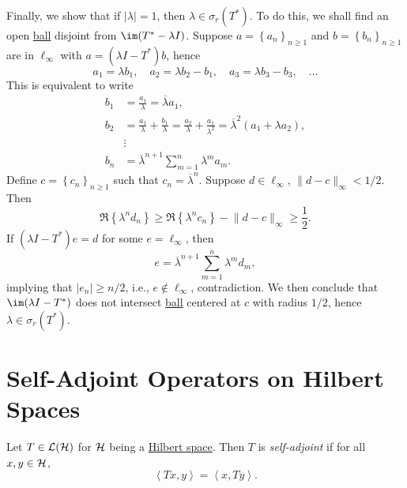 \begin{eg}
\begin{itemize}
		      Finally, we show that if \(\vert \lambda  \vert = 1\), then \(\lambda \in \sigma _r(T^{\ast} )\). To do this, we shall find an open \hyperref[def:ball]{ball} disjoint from \(\im(T^{\ast} - \lambda I)\). Suppose \(a = \left\{ a_n \right\} _{n\geq 1}\) and \(b = \left\{ b_n \right\} _{n\geq 1}\) are in \(\ell _\infty \) with \(a = (\lambda I-T^{\ast} )b\), hence
		      \[
			      a_1 = \lambda b_1,\quad
			      a_2 = \lambda b_2 - b_1,\quad
			      a_3 = \lambda b_3 - b_3, \quad \ldots
		      \]
		      This is equivalent to write
		      \[
			      \begin{split}
				      b_1 &= \frac{a_1}{\lambda } = \overline{\lambda} a_1, \\
				      b_2 &= \frac{a_1}{\lambda } + \frac{b_1}{\lambda } = \frac{a_2}{\lambda } + \frac{a_1}{\lambda ^{2} } = \overline{\lambda} ^{2} (a_1 + \lambda a_2), \\
				      &\vdots\\
				      b_n &= \overline{\lambda} ^{n+1}\sum_{m=1}^{n} \lambda ^m a_m.
			      \end{split}
		      \]
		      Define \(c = \left\{ c_n \right\} _{n\geq 1}\) such that \(c_n = \overline{\lambda} ^n\). Suppose \(d\in \ell _\infty \), \(\lVert d-c \rVert _\infty < 1/2\). Then
		      \[
			      \Re \left\{ \lambda ^n d_n \right\}
			      \geq \Re \left\{ \lambda ^n c_n \right\} - \lVert d-c \rVert _\infty
			      \geq \frac{1}{2}.
		      \]
		      If \((\lambda I - T^{\ast} ) e = d\) for some \(e = \ell _\infty \), then
		      \[
			      e = \overline{\lambda} ^{n+1} \sum_{m=1}^{n} \lambda ^m d_m,
		      \]
		      implying that \(\vert e_n \vert \geq n / 2\), i.e., \(e \notin \ell _\infty \), contradiction. We then conclude that \(\im(\lambda I - T^{\ast} )\) does not intersect \hyperref[def:ball]{ball} centered at \(c\) with radius \(1 / 2\), hence \(\lambda \in \sigma _r(T^{\ast} )\).
	\end{itemize}
\end{eg}

\chapter{Self-Adjoint Operators on Hilbert Spaces}

\begin{definition}\label{def:self-adjoint-op}
	Let \(T\in \mathcal{\MakeUppercase{l}} (\mathcal{\MakeUppercase{h}} )\) for \(\mathcal{\MakeUppercase{h}} \) being a \hyperref[def:Hilbert-space]{Hilbert space}. Then \(T\) is \emph{self-adjoint} if for all \(x, y\in \mathcal{\MakeUppercase{h}} \),
	\[
		\left\langle Tx, y \right\rangle = \left\langle x, Ty \right\rangle.
	\]
\end{definition}

